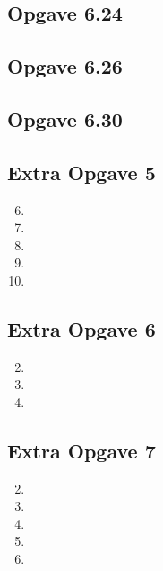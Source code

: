 \documentclass[11pt]{article}
\begin{document}
%

\subsection*{Opgave 6.24}

\subsection*{Opgave 6.26}

\subsection*{Opgave 6.30}

\subsection*{Extra Opgave 5}
\begin{enumerate}[label=\alph*]
  \setcounter{enumi}{5}
  \item
  \setcounter{enumi}{8}
  \item
  \setcounter{enumi}{12}
  \item
  \setcounter{enumi}{17}
  \item
  \setcounter{enumi}{18}
  \item
\end{enumerate}


\subsection*{Extra Opgave 6}
\begin{enumerate}[label=\roman*]
  \setcounter{enumi}{1}
  \item
  \setcounter{enumi}{3}
  \item
  \setcounter{enumi}{5}
  \item
\end{enumerate}

\subsection*{Extra Opgave 7}
\begin{enumerate}[label=\roman*]
  \setcounter{enumi}{1}
  \item
  \setcounter{enumi}{3}
  \item
  \setcounter{enumi}{5}
  \item
  \setcounter{enumi}{7}
  \item
  \setcounter{enumi}{9}
  \item
\end{enumerate}
\end{document}
